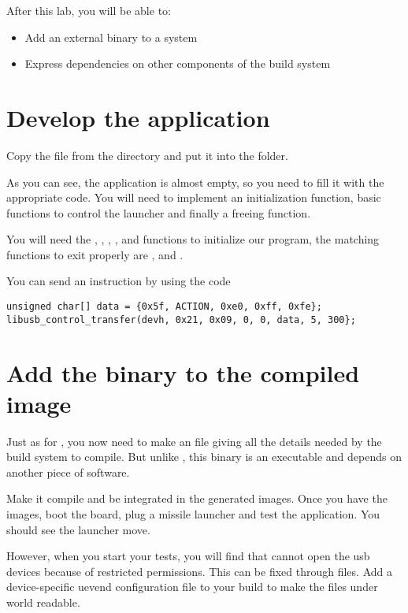 
After this lab, you will be able to:
\begin{itemize}
  \item Add an external binary to a system
  \item Express dependencies on other components of the build system
\end{itemize}

\section{Develop the application}

Copy the  file from the
 directory and put it
into the  folder.

As you can see, the application is almost empty, so you need to fill
it with the appropriate code. You will need to implement an
initialization function, basic functions to control the launcher and
finally a freeing function.

You will need the , ,
, ,
 and 
functions to initialize our program, the matching functions to exit
properly are , 
and .

You can send an instruction by using the code
\begin{lstlisting}
unsigned char[] data = {0x5f, ACTION, 0xe0, 0xff, 0xfe};
libusb_control_transfer(devh, 0x21, 0x09, 0, 0, data, 5, 300};
\end{lstlisting}

\section{Add the binary to the compiled image}

Just as for , you now need to make an  file
giving all the details needed by the build system to compile. But
unlike , this binary is an executable and depends on another
piece of software.

Make it compile and be integrated in the generated images. Once you
have the images, boot the board, plug a missile launcher and test the
application. You should see the launcher move.

However, when you start your tests, you will find that  cannot open
the usb devices because of restricted permissions. This can be fixed
through  files. Add a device-specific uevend
configuration file to your build to make the files under
 world readable.
